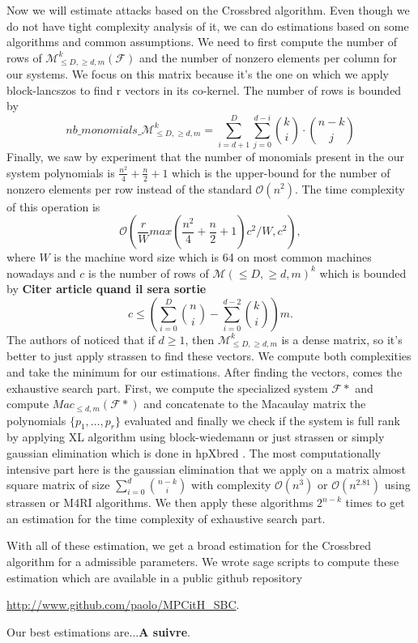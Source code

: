 \documentclass[english]{article}
\begin{document}
		Now we will estimate attacks based on the Crossbred algorithm. Even though we do not have tight complexity analysis of it, we can do estimations based on some algorithms and common assumptions.
		We need to first compute the number of rows of $\mathcal{M}_{\leq D, \geq d, m}^k(\mathcal{F})$ and the number of nonzero elements per column for our systems. We focus on this matrix because it's the one on which we apply block-lancszos to find r vectors in its co-kernel.
		The number of rows is bounded by $$nb\_monomials\_\mathcal{M}_{\leq D, \geq d, m}^k = \sum_{i=d+1}^{D}\sum_{j=0}^{d-i} \binom{k}{i} \cdot \binom{n-k}{j}$$
		Finally, we saw by experiment that the number of monomials present in the our system polynomials is $\frac{n^2}{4} + \frac{n}{2} + 1$ which is the upper-bound for the number of nonzero elements per row instead of the standard $\mathcal{O}(n^2)$. The time complexity of this operation is 
		$$
		\mathcal{O}\left(\frac{r}{W}max(\frac{n^2}{4} + \frac{n}{2} + 1)c^2/W, c^2\right),
		$$
		where $W$ is the machine word size which is 64 on most common machines nowadays and $c$ is the number of rows of $\mathcal{M}(\leq D, \geq d, m)^k$ which is bounded by \textbf{Citer article quand il sera sortie}
		$$
			c \leq \left(\sum_{i=0}^{D}\binom{n}{i} - \sum_{i=0}^{d-2}\binom{k}{i}\right)m.
		$$
		The authors of \cite{MQOMv2} noticed that if $d \geq 1$, then $\mathcal{M}_{\leq D, \geq d, m}^k$ is a dense matrix, so it's better to just apply strassen to find these vectors. We compute both complexities and take the minimum for our estimations.
		After finding the vectors, comes the exhaustive search part. First, we compute the specialized system $\mathcal{F}*$ and compute $Mac_{\leq d, m}(\mathcal{F}*)$ and concatenate to the Macaulay matrix the polynomials $\{p_1,\dots,p_r\}$ evaluated and finally we check if the system is full rank by applying XL algorithm using block-wiedemann or just strassen or simply gaussian elimination which is done in hpXbred \cite{BS23}. The most computationally intensive part here is the gaussian elimination that we apply on a matrix almost square matrix of size $\sum_{i=0}^{d}\binom{n-k}{i}$ with complexity $\mathcal{O}(n^3)$ or $\mathcal{O}(n^{2.81})$ using strassen or M4RI algorithms. We then apply these algorithms $2^{n-k}$ times to get an estimation for the time complexity of exhaustive search part.
		
		With all of these estimation, we get a broad estimation for the Crossbred algorithm for a admissible parameters. We wrote sage scripts to compute these estimation which are available in a public github repository
		\begin{center}
			\href{http://www.github.com/paolo/MPCitH_SBC}{http://www.github.com/paolo/MPCitH\_SBC}.
		\end{center}
		Our best estimations are...\textbf{A suivre}.
		
\end{document}
